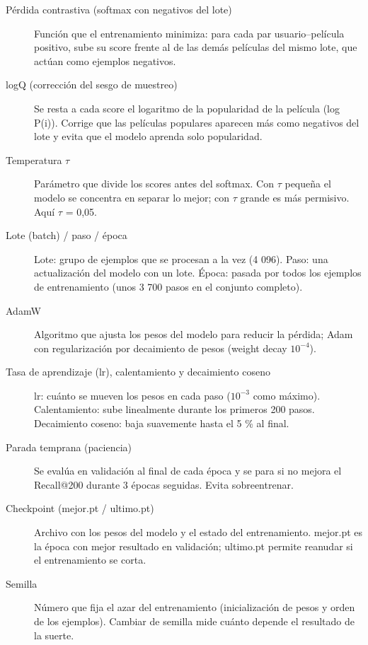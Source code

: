 \begin{description}
\item[Pérdida contrastiva (softmax con negativos del lote)] Función que el entrenamiento minimiza: para cada par usuario–película positivo, sube su score frente al de las demás películas del mismo lote, que actúan como ejemplos negativos.
\item[logQ (corrección del sesgo de muestreo)] Se resta a cada score el logaritmo de la popularidad de la película (log P(i)). Corrige que las películas populares aparecen más como negativos del lote y evita que el modelo aprenda solo popularidad.
\item[Temperatura $\tau$] Parámetro que divide los scores antes del softmax. Con $\tau$ pequeña el modelo se concentra en separar lo mejor; con $\tau$ grande es más permisivo. Aquí $\tau$ = 0,05.
\item[Lote (batch) /\allowbreak{} paso /\allowbreak{} época] Lote: grupo de ejemplos que se procesan a la vez (4 096). Paso: una actualización del modelo con un lote. Época: pasada por todos los ejemplos de entrenamiento (unos 3 700 pasos en el conjunto completo).
\item[AdamW] Algoritmo que ajusta los pesos del modelo para reducir la pérdida; Adam con regularización por decaimiento de pesos (weight decay $10^{-4}$).
\item[Tasa de aprendizaje (lr), calentamiento y decaimiento coseno] lr: cuánto se mueven los pesos en cada paso ($10^{-3}$ como máximo). Calentamiento: sube linealmente durante los primeros 200 pasos. Decaimiento coseno: baja suavemente hasta el 5 \% al final.
\item[Parada temprana (paciencia)] Se evalúa en validación al final de cada época y se para si no mejora el Recall@200 durante 3 épocas seguidas. Evita sobreentrenar.
\item[Checkpoint (mejor.pt /\allowbreak{} ultimo.pt)] Archivo con los pesos del modelo y el estado del entrenamiento. mejor.pt es la época con mejor resultado en validación; ultimo.pt permite reanudar si el entrenamiento se corta.
\item[Semilla] Número que fija el azar del entrenamiento (inicialización de pesos y orden de los ejemplos). Cambiar de semilla mide cuánto depende el resultado de la suerte.
\end{description}

